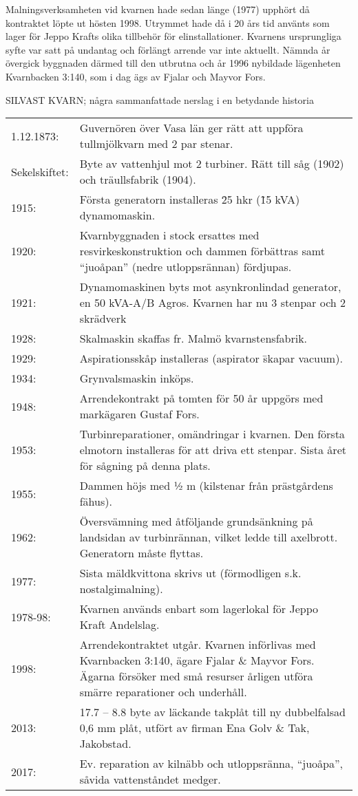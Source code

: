 Malningsverksamheten vid kvarnen hade sedan länge (1977) upphört då kontraktet löpte ut hösten 1998. Utrymmet hade då i 20 års tid använts som lager för Jeppo Krafts olika tillbehör för elinstallationer. Kvarnens ursprungliga syfte var satt på undantag och förlängt arrende var inte aktuellt. Nämnda år övergick byggnaden därmed till den utbrutna och år 1996 nybildade lägenheten Kvarnbacken 3:140, som i dag ägs av Fjalar och Mayvor Fors.

SILVAST KVARN; några sammanfattade nerslag i en betydande historia
\begin{center}
  \begin{tabular}{l p{}}
    \hline
    1.12.1873: &	Guvernören över Vasa län ger rätt att uppföra tullmjölkvarn med 2 par	stenar. \\
    Sekelskiftet: &	Byte av vattenhjul mot 2 turbiner. Rätt till såg (1902) och träullsfabrik (1904). \\
    1915: &	Första generatorn installeras \= 25 hkr (\~15 kVA) dynamomaskin. \\
    1920: &	Kvarnbyggnaden i stock ersattes med resvirkeskonstruktion och dammen förbättras samt ``juoåpan'' (nedre utloppsrännan) fördjupas. \\
    1921: & Dynamomaskinen byts mot asynkronlindad generator, en 50 kVA-A/B Agros. Kvarnen har nu 3 stenpar och 2 skrädverk \\
    1928: &	Skalmaskin skaffas fr. Malmö kvarnstensfabrik. \\
    1929: &	Aspirationsskåp installeras (aspirator \= skapar vacuum). \\
    1934: &	Grynvalsmaskin inköps. \\
    1948:	&	Arrendekontrakt på tomten för 50 år uppgörs med markägaren Gustaf Fors. \\
    1953: &	Turbinreparationer, omändringar i kvarnen. Den första elmotorn installeras för att driva ett stenpar. Sista året för sågning på denna plats. \\
    1955: &	Dammen höjs med ½ m (kilstenar från prästgårdens fähus). \\
    1962: &	Översvämning med åtföljande grundsänkning på landsidan av turbinrännan, vilket ledde till axelbrott. Generatorn måste flyttas. \\
    1977: &	Sista mäldkvittona skrivs ut (förmodligen s.k. nostalgimalning). \\
    1978-98: & Kvarnen används enbart som lagerlokal för Jeppo Kraft Andelslag. \\
    1998:	&	Arrendekontraktet utgår. Kvarnen införlivas med Kvarnbacken 3:140, ägare Fjalar \& Mayvor Fors. Ägarna försöker med små resurser årligen utföra smärre reparationer och underhåll. \\
    2013:	&	17.7 – 8.8 byte av läckande takplåt till ny dubbelfalsad 0,6 mm plåt, utfört av firman Ena Golv \& Tak, Jakobstad. \\
    2017: & Ev. reparation av kilnäbb och utloppsränna, ``juoåpa'', såvida vattenståndet medger. \\
    \hline
  \end{tabular}
\end{center}



